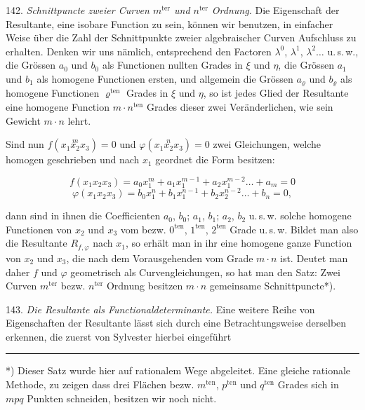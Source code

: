 142. \textit{Schnittpuncte zweier Curven $m^{\text{ter}}$ und $n^{\text{ter}}$ Ordnung.} Die
Eigenschaft der Resultante, eine isobare Function zu sein, k\"onnen wir benutzen, in
einfacher Weise \"uber die Zahl der Schnittpunkte zweier algebraischer Curven Aufschluss zu
erhalten. Denken wir uns n\"amlich, entsprechend den Factoren $\lambda^0$, $\lambda^1$,
$\lambda^2\ldots$ u.\,s.\,w., die Gr\"ossen $a_0$ und $b_0$ als Functionen nullten Grades in
$\xi$ und $\eta$, die Gr\"ossen $a_1$ und $b_1$ als homogene Functionen ersten, und allgemein
die Gr\"ossen $a_\varrho$ und $b_\varrho$ als homogene Functionen $\varrho^{\text{ten}}$
Grades in $\xi$ und $\eta$, so ist jedes Glied der Resultante eine homogene Function
$m\cdot n^{\text{ten}}$ Grades dieser zwei Ver\"anderlichen, wie sein Gewicht $m\cdot n$
lehrt.

Sind nun $f(x_1\overset{m}{x_2}x_3) = 0$ und $\varphi(x_1\overset{n}{x_2}x_3) = 0$ zwei
Gleichungen, welche homogen geschrieben und nach $x_1$ geordnet die Form besitzen:

\[ f(x_1x_2x_3) = a_0x_1^m + a_1x_1^{m-1} + a_2x_1^{m-2}\ldots + a_m = 0 \]
\[ \varphi(x_1x_2x_3) = b_0x_1^n + b_1x_1^{n-1} + b_2x_2^{n-2}\ldots + b_n = 0, \] %

dann sind in ihnen die Coefficienten $a_0$, $b_0$; $a_1$, $b_1$; $a_2$, $b_2$ u.\,s.\,w.
solche homogene Functionen von $x_2$ und $x_3$ vom bezw. $0^{\text{ten}}$,
$1^{\text{ten}}$, $2^{\text{ten}}$ Grade u.\,s.\,w. Bildet man also die Resultante
$R_{f,\varphi}$ nach $x_1$, so erh\"alt man in ihr eine homogene ganze Function von $x_2$
und $x_3$, die nach dem Vorausgehenden vom Grade $m\cdot n$ ist. Deutet man daher $f$ und
$\varphi$ geometrisch als Curvengleichungen, so hat man den Satz: Zwei Curven
$m^{\text{ter}}$ bezw. $n^{\text{ter}}$ Ordnung besitzen $m\cdot n$ gemeinsame
Schnittpuncte*).

143. \textit{Die Resultante als Functionaldeterminante.} Eine weitere Reihe von
Eigenschaften der Resultante l\"asst sich durch eine Betrachtungsweise derselben erkennen,
die zuerst von Sylvester hierbei eingef\"uhrt

\bigskip\noindent\rule{4cm}{0.4pt}

\smallskip\noindent
*) Dieser Satz wurde hier auf rationalem Wege abgeleitet. Eine gleiche rationale Methode, zu
zeigen dass drei Fl\"achen bezw. $m^{\text{ten}}$, $p^{\text{ten}}$ und $q^{\text{ten}}$
Grades sich in $mpq$ Punkten schneiden, besitzen wir noch nicht.


